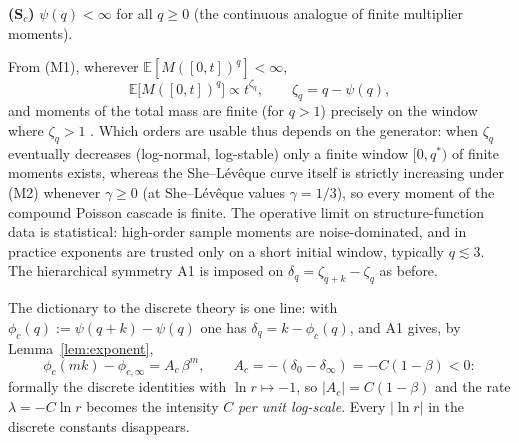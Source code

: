\documentclass[pdflatex,sn-mathphys-num]{sn-jnl}
\theoremstyle{thmstyleone}
\theoremstyle{thmstyletwo}
\theoremstyle{thmstylethree}
\begin{document}
\smallskip
\noindent\textbf{(S$_c$)}  $\psi(q) < \infty$ for all $q \ge 0$ (the
continuous analogue of finite multiplier moments).

\smallskip
From (M1), wherever $\mathbb{E}[M([0,t])^q] < \infty$,
\[
  \mathbb{E}\bigl[M([0,t])^q\bigr] \propto t^{\zeta_q},
  \qquad
  \zeta_q = q - \psi(q),
\]
and moments of the total mass are finite (for $q > 1$) precisely on
the window where $\zeta_q > 1$ \cite{BM03}.  Which orders are
usable thus depends on the generator: when $\zeta_q$ eventually
decreases (log-normal, log-stable) only a finite window $[0, q^*)$
of finite moments exists, whereas the She--L\'ev\^eque curve itself
is strictly increasing under \textup{(M2)} whenever $\gamma \ge 0$
(at She--L\'ev\^eque values $\gamma = 1/3$), so every moment of the
compound Poisson cascade is finite.  The operative limit on
structure-function data is statistical: high-order sample moments
are noise-dominated, and in practice exponents are trusted only on
a short initial window, typically $q \lesssim 3$.  The hierarchical
symmetry A1 is imposed on
$\delta_q = \zeta_{q+k} - \zeta_q$ as before.

The dictionary to the discrete theory is one line: with $\phi_c(q)
:= \psi(q+k) - \psi(q)$ one has $\delta_q = k - \phi_c(q)$, and A1
gives, by Lemma~\ref{lem:exponent},
\[
  \phi_c(mk) - \phi_{c,\infty} = A_c\,\beta^m,
  \qquad
  A_c = -(\delta_0 - \delta_\infty) = -C(1-\beta) < 0 :
\]
formally the discrete identities with $\ln r \mapsto -1$, so $|A_c|
= C(1-\beta)$ and the rate $\lambda = -C\ln r$ becomes the intensity
$C$ \emph{per unit log-scale}.  Every $|\ln r|$ in the discrete
constants disappears.
\end{document}
